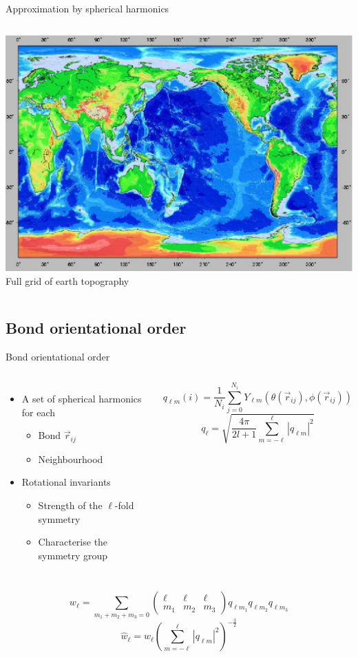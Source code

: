 \begin{frame}{Approximation by spherical harmonics}
\begin{columns}[T]
	\includegraphics[width=\textwidth]{earth_grid}\\
	\footnotesize{Full grid of earth topography}
	\end{columns}
\end{frame}

\subsection{Bond orientational order}


\begin{frame}{Bond orientational order}
	\begin{columns}
	\begin{itemize}
		\item A set of spherical harmonics for each
		\begin{itemize}
			\item Bond $\vec{r}_{ij}$
			\item Neighbourhood
		\end{itemize}
		\item Rotational invariants
		\begin{itemize}
			\item Strength of the $\ell$-fold symmetry
			\item Characterise the symmetry group
		\end{itemize}
	\end{itemize}
	\[ q_{\ell m}(i) = \frac{1}{N_i}\sum_{j=0}^{N_i} Y_{\ell m}(\theta(\vec r_{ij}),\phi(\vec r_{ij})) \]
	\[ q_\ell = \sqrt{\frac{4\pi}{2l+1} \sum_{m=-\ell}^{\ell} |q_{\ell m}|^2 } \]
	\end{columns}
	\[w_\ell = \sum_{m_1+m_2+m_3=0} 
			\left( \begin{array}{ccc}
				\ell & \ell & \ell \\
				m_1 & m_2 & m_3 
			\end{array} \right)
			q_{\ell m_1} q_{\ell m_2} q_{\ell m_3}\]
	\[\hat{w}_\ell = w_\ell{\left( \sum_{m=-\ell}^{\ell} |q_{\ell m}|^2 \right)}^{-\frac{3}{2}}\]
	
	\footnotesize{\citet{steinhardt1983boo}}
\end{frame}

